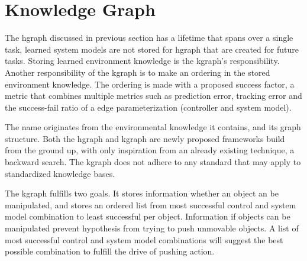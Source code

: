 \section{Knowledge Graph}%
\label{sec:kgraph}
The \ac{hgraph} discussed in previous section has a lifetime that spans over a single task, learned system models are not stored for \ac{hgraph} that are created for future tasks. Storing learned environment knowledge is the \ac{kgraph}'s responsibility. Another responsibility of the \ac{kgraph} is to make an ordering in the stored environment knowledge. The ordering is made with a proposed success factor, a metric that combines multiple metrics such as prediction error, tracking error and the success-fail ratio of a edge parameterization (controller and system model).\bs

The name  originates from the environmental knowledge it contains, and its graph structure. Both the \ac{hgraph} and \ac{kgraph} are newly proposed frameworks build from the ground up, with only inspiration from an already existing technique, a backward search. The \ac{kgraph} does not adhere to any standard that may apply to standardized knowledge bases. 
\bs





The \ac{kgraph} fulfills two goals. It stores information whether an object an be manipulated, and stores an ordered list from most successful control and system model combination to least successful per object. Information if objects can be manipulated prevent hypothesis from trying to push unmovable objects. A list of most successful control and system model combinations will suggest the best possible combination to fulfill the drive of pushing action.\bs

